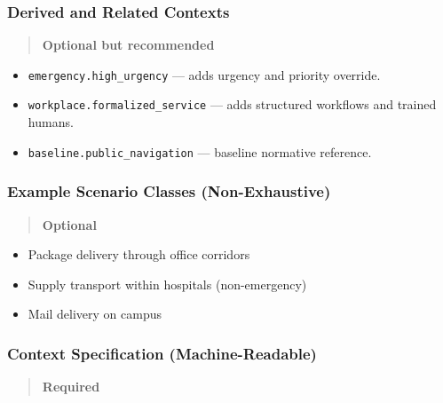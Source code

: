 \documentclass[utf8]{frontiers_suppmat} %
\providecommand{\tightlist}{%
  \setlength{\itemsep}{0pt}\setlength{\parskip}{0pt}}
\begin{document}
\subsubsection{Derived and Related
Contexts}\label{derived-and-related-contexts}

\begin{quote}
\textbf{Optional but recommended}
\end{quote}

\begin{itemize}
\tightlist
\item
  \texttt{emergency.high\_urgency} --- adds urgency and
  priority override.
\item
  \texttt{workplace.formalized\_service} --- adds
  structured workflows and trained humans.
\item
  \texttt{baseline.public\_navigation} --- baseline
  normative reference.
\end{itemize}

\subsubsection{Example Scenario Classes
(Non-Exhaustive)}\label{example-scenario-classes-non-exhaustive}

\begin{quote}
\textbf{Optional}
\end{quote}

\begin{itemize}
\tightlist
\item
  Package delivery through office corridors
\item
  Supply transport within hospitals (non-emergency)
\item
  Mail delivery on campus
\end{itemize}

\subsubsection{Context Specification
(Machine-Readable)}\label{context-specification-machine-readable}

\begin{quote}
\textbf{Required}
\end{quote}
\end{document}
